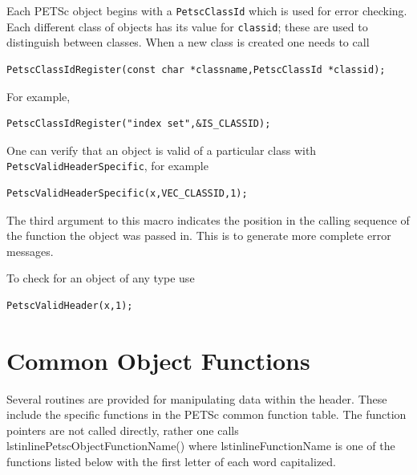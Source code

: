 Each PETSc object begins with a \lstinline{PetscClassId} which is used for error checking.
Each different class of objects has its value for \lstinline{classid}; these are used
to distinguish between classes. When a new class is created one needs to call
\begin{lstlisting}
PetscClassIdRegister(const char *classname,PetscClassId *classid);
\end{lstlisting}
For example,
\begin{lstlisting}
PetscClassIdRegister("index set",&IS_CLASSID);
\end{lstlisting}
One can verify that an object is valid of a particular class with \lstinline{PetscValidHeaderSpecific}, for example
\begin{lstlisting}
PetscValidHeaderSpecific(x,VEC_CLASSID,1);
\end{lstlisting}
The third argument to this macro indicates the position in the calling sequence of the
function the object was passed in. This is to generate more complete error messages.

To check for an object of any type use
\begin{lstlisting}
PetscValidHeader(x,1);
\end{lstlisting}

\section{Common Object Functions}

Several routines are provided for manipulating data within the header.
These include the specific functions in the PETSc common function
table. The function pointers are not called directly, rather one calls
lstinline{PetscObjectFunctionName()} where lstinline{FunctionName} is
one of the functions listed below with the first letter of each word
capitalized.


